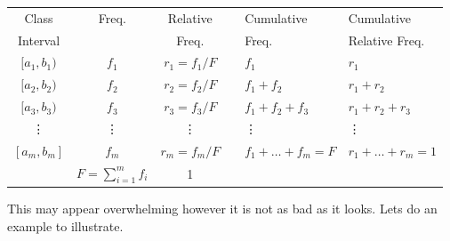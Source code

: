 \begin{center}
\def\arraystretch{1.15}
\begin{tabular}{c c c c l l}
Class			&	Freq.		&	Relative			&	&	Cumulative				&	Cumulative	\\
Interval			&			&	Freq.				&  	&	Freq.						&	Relative Freq.	\\
\hline
$[a_{1}, b_{1})$		&	$f_{1}$	&	$r_{1} = f_{1} / F$	& 	&	$f_{1}$					&	$r_{1}$\\
$[a_{2}, b_{2})$		&	$f_{2}$	&	$r_{2} = f_{2} / F$	&  	&	$f_{1} + f_{2}$				&	$r_{1}+r_{2}$\\
$[a_{3}, b_{3})$		&	$f_{3}$	&	$r_{3} = f_{3} / F$	& 	&	$f_{1} + f_{2} + f_{3}$		&	$r_{1}+r_{2}+r_{3}$\\
\vdots			&	\vdots	&	\vdots			&  	&	\hspace{0.75cm} \vdots		&	\hspace{0.75cm} \vdots\\
$[a_{m}, b_{m}]$	&	$f_{m}$	&	$r_{m} = f_{m} / F$	& 	&	$f_{1} + \ldots + f_{m} = F$	&	$r_{1} + \ldots + r_{m} = 1$\\
\hline
				&	$F = \displaystyle\sum_{i=1}^{m} f_{i}$ & 1 \\
\end{tabular}
\end{center}

\noindent
This may appear overwhelming however it is not as bad as it looks.
Lets do an example to illustrate.

